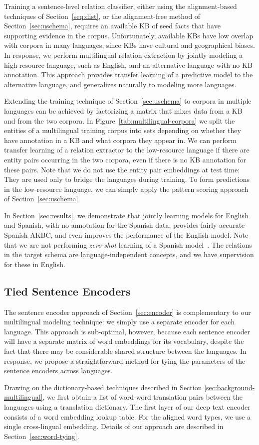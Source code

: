 Training a sentence-level relation classifier, either using the alignment-based techniques of Section~\ref{seq:dist}, or the alignment-free method of Section~\ref{sec:uschema}, requires an available KB of seed facts that have supporting evidence in the corpus.  Unfortunately, available KBs have low overlap with corpora in many languages, since KBs have cultural and geographical biases. In response, we perform multilingual relation extraction by jointly modeling a high-resource language, such as English, and an alternative language with no KB annotation. This approach provides transfer learning of a predictive model to the alternative language, and generalizes naturally to modeling more languages.


Extending the training technique of Section~\ref{sec:uschema} to corpora in multiple languages can be achieved by factorizing a matrix that mixes data from a KB and from the two corpora. In Figure~\ref{tab:multilingual-corpora} we split the entities of a multilingual training corpus into sets depending on whether they have annotation in a KB and what corpora they appear in. We can perform transfer learning of a relation extractor to the low-resource language if there are entity pairs occurring in the two corpora, even if there is no KB annotation for these pairs. Note that we do not use the entity pair embeddings at test time: They are used only to bridge the languages during training. To form predictions in the low-resource language, we can simply apply the pattern scoring approach of Section~\ref{sec:uschema}.

In Section~\ref{sec:results}, we demonstrate that jointly learning models for English and Spanish, with no annotation for the Spanish data, provides fairly accurate Spanish AKBC, and even improves the performance of the English model. Note that we are not performing \textit{zero-shot} learning of a Spanish model~\citep{zeroshot}. The relations in the target schema are language-independent concepts, and we have supervision for these in English.



\subsection{Tied Sentence Encoders \label{sec:tie-words}}
The sentence encoder approach of Section~\ref{sec:encoder} is complementary to our multilingual modeling technique: we simply use a separate encoder for each language.  This approach is sub-optimal, however, because each sentence encoder will have a separate matrix of word embeddings for its vocabulary, despite the fact that there may be considerable shared structure between the languages. In response, we propose a straightforward method for tying the parameters of the sentence encoders across languages.

Drawing on the dictionary-based techniques described in Section \ref{sec:background-multilingual}, we first obtain a list of word-word translation pairs between the languages using a translation dictionary. The first layer of our deep text encoder consists of a word embedding lookup table. For the aligned word types, we use a single cross-lingual embedding.
Details of our approach are described in Section~\ref{sec:word-tying}.


